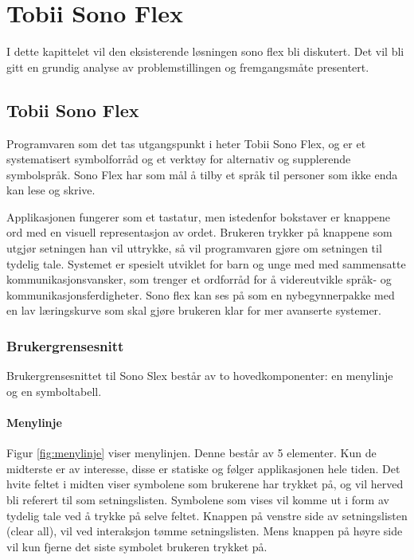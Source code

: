 

\chapter{Tobii Sono Flex}

I dette kapittelet vil den eksisterende løsningen sono flex bli diskutert. Det vil bli gitt en grundig analyse av problemstillingen og fremgangsmåte presentert.


\section{Tobii Sono Flex}
\label{chap:Tobii-Sono-Flex}


Programvaren som det tas utgangspunkt i heter Tobii Sono Flex,  og er et systematisert symbolforråd og et verktøy for alternativ og supplerende symbolspråk. Sono Flex har som mål å tilby et språk til personer som ikke enda kan lese og skrive. 

Applikasjonen fungerer som et tastatur, men istedenfor bokstaver er knappene ord med en visuell representasjon av ordet. Brukeren trykker på knappene som utgjør setningen han vil uttrykke, så vil programvaren gjøre om setningen til tydelig tale.  Systemet er spesielt utviklet for barn og unge med med sammensatte kommunikasjonsvansker, som trenger et ordforråd for å videreutvikle språk- og kommunikasjonsferdigheter. Sono flex kan ses på som en nybegynnerpakke med en lav læringskurve som skal gjøre brukeren klar for mer avanserte systemer. 


\subsection{Brukergrensesnitt}

Brukergrensesnittet til Sono Slex består av to hovedkomponenter: en menylinje og en symboltabell. 


\subsubsection{Menylinje}

Figur \ref{fig:menylinje} viser menylinjen.  Denne består av 5 elementer.  Kun de midterste er av interesse, disse  er statiske og følger applikasjonen hele tiden. Det hvite feltet i midten viser symbolene som brukerene har trykket på, og vil herved bli referert til som setningslisten. Symbolene som vises vil komme ut i form av tydelig tale ved å trykke på selve feltet. Knappen på venstre side av setningslisten (clear all), vil ved interaksjon tømme setningslisten. Mens knappen på høyre side vil kun fjerne det siste symbolet brukeren trykket på.


